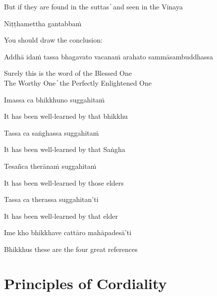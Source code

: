 \begin{cprenglish}
  But if they are found in the suttas  ̓  and seen in the Vinaya
\end{cprenglish}

Niṭṭhamettha gantabbaṁ

\begin{cprenglish}
  You should draw the conclusion:
\end{cprenglish}

Addhā idaṁ tassa bhagavato vacanaṁ arahato sammāsambuddhassa

\begin{cprenglish}
  Surely this is the word of the Blessed One\\
  The Worthy One  ̓  the Perfectly Enlightened One
\end{cprenglish}

Imassa ca bhikkhuno suggahitaṁ

\begin{cprenglish}
  It has been well-learned by that bhikkhu
\end{cprenglish}

Tassa ca saṅghassa suggahitaṁ

\begin{cprenglish}
  It has been well-learned by that Saṅgha
\end{cprenglish}

Tesañca therānaṁ suggahitaṁ

\begin{cprenglish}
  It has been well-learned by those elders
\end{cprenglish}

Tassa ca therassa suggahitan’ti

\begin{cprenglish}
  It has been well-learned by that elder
\end{cprenglish}

Ime kho bhikkhave cattāro mahāpadesā’ti

\begin{cprenglish}
  Bhikkhus these are the four great references
\end{cprenglish}


\clearpage

\section{Principles of Cordiality}

